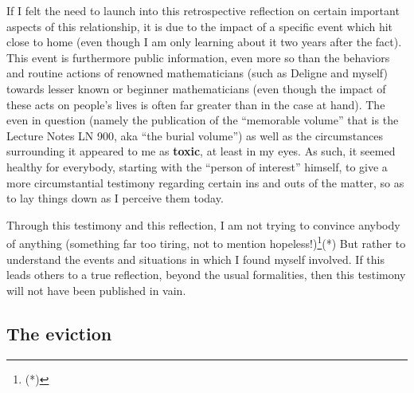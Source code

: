 If I felt the need to launch into this retrospective reflection on certain important
aspects of this relationship, it is due to the impact of a specific event which hit close
to home (even though I am only learning about it two years after the fact). 
This event is furthermore public information, even more so than the behaviors and routine
actions of renowned mathematicians (such as Deligne and myself) towards lesser known 
or beginner mathematicians (even though the impact of these acts on people's lives 
is often far greater than in the case at hand). 
The even in question (namely the publication of the ``memorable volume'' that is the
Lecture Notes LN 900, aka ``the burial volume'') as well as the circumstances surrounding
it appeared to me as \textbf{toxic}, at least in my eyes. 
As such, it seemed healthy for everybody, starting with the ``person of interest''
himself, to give a more circumstantial testimony regarding certain
ins and outs of the matter, so as to lay things down as I perceive them today. 

Through this testimony and this reflection, I am not trying to convince anybody of
anything (something far too tiring, not to mention hopeless!)\footnote{(*)}(*)
But rather to understand the events and situations in which I found myself involved. 
If this leads others to a true reflection, beyond the usual formalities, then this
testimony will not have been published in vain. 

\subsection{The eviction}

